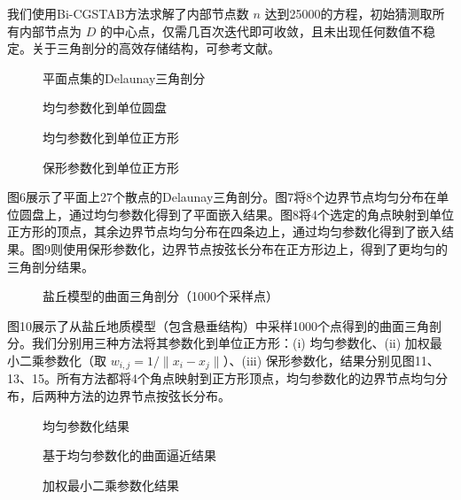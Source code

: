 \documentclass{ctexart}
\theoremstyle{proof}
\begin{document}
我们使用Bi-CGSTAB方法求解了内部节点数 $n$ 达到25000的方程，初始猜测取所有内部节点为 $D$ 的中心点，仅需几百次迭代即可收敛，且未出现任何数值不稳定。关于三角剖分的高效存储结构，可参考文献\cite{cline1984}。

\begin{figure}[htbp]
    \centering
    \caption{平面点集的Delaunay三角剖分}
    \label{fig:6}
\end{figure}

\begin{figure}[htbp]
    \centering
    \caption{均匀参数化到单位圆盘}
    \label{fig:7}
\end{figure}

\begin{figure}[htbp]
    \centering
    \caption{均匀参数化到单位正方形}
    \label{fig:8}
\end{figure}

\begin{figure}[htbp]
    \centering
    \caption{保形参数化到单位正方形}
    \label{fig:9}
\end{figure}

图6展示了平面上27个散点的Delaunay三角剖分。图7将8个边界节点均匀分布在单位圆盘上，通过均匀参数化得到了平面嵌入结果。图8将4个选定的角点映射到单位正方形的顶点，其余边界节点均匀分布在四条边上，通过均匀参数化得到了嵌入结果。图9则使用保形参数化，边界节点按弦长分布在正方形边上，得到了更均匀的三角剖分结果。

\begin{figure}[htbp]
    \centering
    \caption{盐丘模型的曲面三角剖分（1000个采样点）}
    \label{fig:10}
\end{figure}

图10展示了从盐丘地质模型（包含悬垂结构）中采样1000个点得到的曲面三角剖分。我们分别用三种方法将其参数化到单位正方形：(i) 均匀参数化、(ii) 加权最小二乘参数化（取 $w_{i,j}=1/\|x_i-x_j\|$）、(iii) 保形参数化，结果分别见图11、13、15。所有方法都将4个角点映射到正方形顶点，均匀参数化的边界节点均匀分布，后两种方法的边界节点按弦长分布。

\begin{figure}[htbp]
    \centering
    \caption{均匀参数化结果}
    \label{fig:11}
\end{figure}

\begin{figure}[htbp]
    \centering
    \caption{基于均匀参数化的曲面逼近结果}
    \label{fig:12}
\end{figure}

\begin{figure}[htbp]
    \centering
    \caption{加权最小二乘参数化结果}
    \label{fig:13}
\end{figure}
\end{document}
